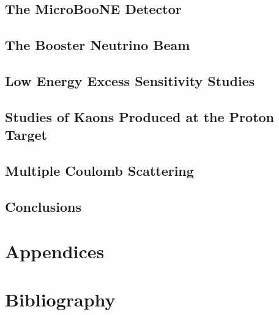 \documentclass[11pt,openright,twoside,letterpaper,onecolumn]{report} %
\begin{document}
\chapter{The MicroBooNE Detector}
\label{sec:detector}


\chapter{The Booster Neutrino Beam}
\label{sec:beam}


\chapter{Low Energy Excess Sensitivity Studies}
\label{sec:LEEsensitivity}


\chapter{Studies of Kaons Produced at the Proton Target}
\label{sec:kaon}


\chapter{Multiple Coulomb Scattering}
\label{sec:MCS}


\chapter{Conclusions}
\label{sec:conclusions}


\part{Appendices}
\appendix



\part{Bibliography}

 
\end{document}
